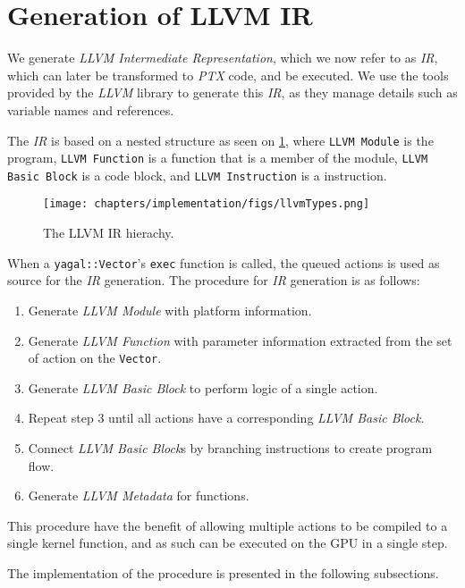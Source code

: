 \section{Generation of LLVM IR} \label{sec:actionToIr}
 We generate \textit{LLVM Intermediate Representation}, which we now refer to as \textit{IR}, which can later be transformed to \textit{PTX} code, and be executed. We use the tools provided by the \textit{LLVM} library to generate this \textit{IR}, as they manage details such as variable names and references.

The \textit{IR} is based on a nested structure as seen on \ref{fig:llvmTypes}, where \texttt{LLVM Module} is the program, \texttt{LLVM Function} is a function that is a member of the module,  \texttt{LLVM Basic Block} is a code block, and \texttt{LLVM Instruction} is a instruction. 

\begin{figure}[!htb]
    \center
    \label{fig:llvmTypes}
    \texttt{[image: chapters/implementation/figs/llvmTypes.png]}
    \caption{The LLVM IR hierachy.}
\end{figure}

When a \texttt{yagal::Vector}'s \texttt{exec} function is called, the queued actions is used as source for the \textit{IR} generation. The procedure for \textit{IR} generation is as follows:

\begin{enumerate}
\item Generate \textit{LLVM Module} with platform information.
\item Generate \textit{LLVM Function} with parameter information extracted from the set of action on the \texttt{Vector}.
\item Generate \textit{LLVM Basic Block} to perform logic of a single action.
\item Repeat step 3 until all actions have a corresponding \textit{LLVM Basic Block}.
\item Connect \textit{LLVM Basic Block}s by branching instructions to create program flow.
\item Generate \textit{LLVM Metadata} for functions.
\end{enumerate}

This procedure have the benefit of allowing multiple actions to be compiled to a single kernel function, and as such can be executed on the GPU in a single step.

The implementation of the procedure is presented in the following subsections.


